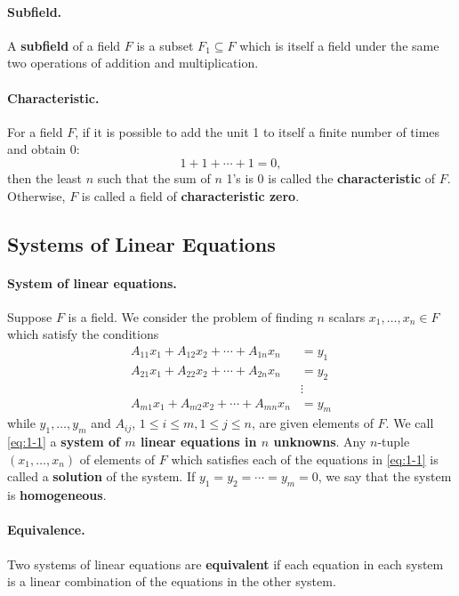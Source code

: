 \documentclass{article}
\begin{document}
\paragraph{Subfield.} A \textbf{subfield} of a field $F$ is a subset $F_1
\subseteq F$ which is itself a field under the same two operations of addition
and multiplication.

\paragraph{Characteristic.} For a field $F$, if it is possible to add the unit
1 to itself a finite number of times and obtain 0: \[
  1 + 1 + \cdots + 1 = 0,
\] then the least $n$ such that the sum of $n$ 1's is 0 is called the
\textbf{characteristic} of $F$. Otherwise, $F$ is called a field of
\textbf{characteristic zero}.

\subsection{Systems of Linear Equations}

\paragraph{System of linear equations.} Suppose $F$ is a field. We consider the
problem of finding $n$ scalars $x_1, \ldots, x_n \in F$ which satisfy the
conditions
\begin{equation}\label{eq:1-1}\tag{1-1}
  \begin{aligned}
    A_{11}x_1 + A_{12}x_2 + \cdots + A_{1n}x_n &= y_1 \\
    A_{21}x_1 + A_{22}x_2 + \cdots + A_{2n}x_n &= y_2 \\
    &\vdots \\
    A_{m1}x_1 + A_{m2}x_2 + \cdots + A_{mn}x_n &= y_m
  \end{aligned}
\end{equation}
while $y_1, \ldots, y_m$ and $A_{ij}$, $1 \leq i \leq m, 1 \leq j \leq n$, are
given elements of $F$. We call \eqref{eq:1-1} a \textbf{system of $m$ linear
equations in $n$ unknowns}. Any $n$-tuple $(x_1, \ldots, x_n)$ of elements of
$F$ which satisfies each of the equations in \eqref{eq:1-1} is called a
\textbf{solution} of the system. If $y_1 = y_2 = \cdots = y_m = 0$, we say that
the system is \textbf{homogeneous}.

\paragraph{Equivalence.} Two systems of linear equations are \textbf{equivalent}
if each equation in each system is a linear combination of the equations in the
other system.
\end{document}
